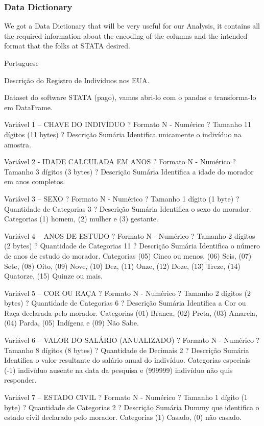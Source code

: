 \documentclass[]{article}
\begin{document}
\hypertarget{data-dictionary}{%
\subsubsection{Data Dictionary}\label{data-dictionary}}

We got a Data Dictionary that will be very useful for our Analysis, it
contains all the required information about the encoding of the columns
and the intended format that the folks at STATA desired.

Portuguese

Descrição do Registro de Indivíduos nos EUA.

Dataset do software STATA (pago), vamos abri-lo com o pandas e
transforma-lo em DataFrame.

Variável 1 -- CHAVE DO INDIVÍDUO ? Formato N - Numérico ? Tamanho 11
dígitos (11 bytes) ? Descrição Sumária Identifica unicamente o indivíduo
na amostra.

Variável 2 - IDADE CALCULADA EM ANOS ? Formato N - Numérico ? Tamanho 3
dígitos (3 bytes) ? Descrição Sumária Identifica a idade do morador em
anos completos.

Variável 3 -- SEXO ? Formato N - Numérico ? Tamanho 1 dígito (1 byte) ?
Quantidade de Categorias 3 ? Descrição Sumária Identifica o sexo do
morador. Categorias (1) homem, (2) mulher e (3) gestante.

Variável 4 -- ANOS DE ESTUDO ? Formato N - Numérico ? Tamanho 2 dígitos
(2 bytes) ? Quantidade de Categorias 11 ? Descrição Sumária Identifica o
número de anos de estudo do morador. Categorias (05) Cinco ou menos,
(06) Seis, (07) Sete, (08) Oito, (09) Nove, (10) Dez, (11) Onze, (12)
Doze, (13) Treze, (14) Quatorze, (15) Quinze ou mais.

Variável 5 -- COR OU RAÇA ? Formato N - Numérico ? Tamanho 2 dígitos (2
bytes) ? Quantidade de Categorias 6 ? Descrição Sumária Identifica a Cor
ou Raça declarada pelo morador. Categorias (01) Branca, (02) Preta, (03)
Amarela, (04) Parda, (05) Indígena e (09) Não Sabe.

Variável 6 -- VALOR DO SALÁRIO (ANUALIZADO) ? Formato N - Numérico ?
Tamanho 8 dígitos (8 bytes) ? Quantidade de Decimais 2 ? Descrição
Sumária Identifica o valor resultante do salário anual do indivíduo.
Categorias especiais (-1) indivíduo ausente na data da pesquisa e
(999999) indivíduo não quis responder.

Variável 7 -- ESTADO CIVIL ? Formato N - Numérico ? Tamanho 1 dígito (1
byte) ? Quantidade de Categorias 2 ? Descrição Sumária Dummy que
identifica o estado civil declarado pelo morador. Categorias (1) Casado,
(0) não casado.
\end{document}
